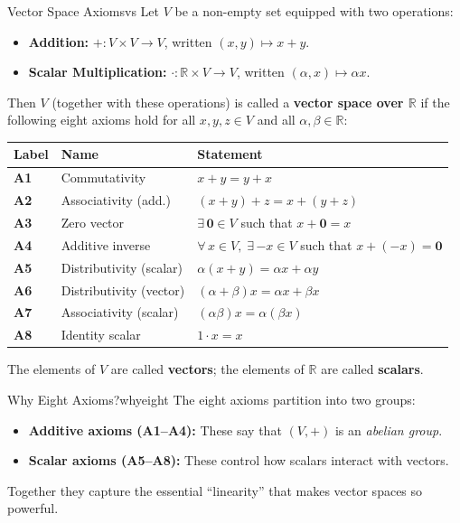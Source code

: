 \documentclass[12pt]{article}
\newcommand{\R}{\mathbb{R}}
\newcommand{\vzero}{\mathbf{0}}
\begin{document}
	\begin{axiombox}{Vector Space Axioms}{vs}
		Let $V$ be a non-empty set equipped with two operations:
		\begin{itemize}[leftmargin=2em]
			\item \textbf{Addition:} $+ : V\times V \to V$, written $(x,y)\mapsto x+y$.
			\item \textbf{Scalar Multiplication:} $\cdot : \R\times V \to V$,
			written $(\alpha, x)\mapsto \alpha x$.
		\end{itemize}
		Then $V$ (together with these operations) is called a \textbf{vector space over
			$\R$} if the following eight axioms hold for all $x,y,z\in V$ and all
		$\alpha,\beta\in\R$:
		
		\medskip
		\begin{tabular}{>{\bfseries}p{1.2cm} p{4.5cm} p{8cm}}
			\toprule
			Label & Name & Statement \\
			\midrule
			A1 & Commutativity &
			$x + y = y + x$ \\[4pt]
			A2 & Associativity (add.) &
			$(x + y) + z = x + (y + z)$ \\[4pt]
			A3 & Zero vector &
			$\exists\, \vzero \in V$ such that $x + \vzero = x$ \\[4pt]
			A4 & Additive inverse &
			$\forall\, x \in V,\; \exists\, {-x}\in V$ such that $x + (-x) = \vzero$ \\[4pt]
			A5 & Distributivity (scalar) &
			$\alpha(x + y) = \alpha x + \alpha y$ \\[4pt]
			A6 & Distributivity (vector) &
			$(\alpha + \beta)x = \alpha x + \beta x$ \\[4pt]
			A7 & Associativity (scalar) &
			$(\alpha\beta)x = \alpha(\beta x)$ \\[4pt]
			A8 & Identity scalar &
			$1\cdot x = x$ \\
			\bottomrule
		\end{tabular}
		
		\medskip\noindent
		The elements of $V$ are called \textbf{vectors}; the elements of $\R$ are called
		\textbf{scalars}.
	\end{axiombox}
	
	\begin{remark}{Why Eight Axioms?}{whyeight}
		The eight axioms partition into two groups:
		\begin{itemize}[leftmargin=2em]
			\item \textbf{Additive axioms (A1--A4):} These say that $(V,+)$ is an
			\emph{abelian group}.
			\item \textbf{Scalar axioms (A5--A8):} These control how scalars interact
			with vectors.
		\end{itemize}
		Together they capture the essential ``linearity'' that makes vector spaces
		so powerful.
	\end{remark}
	
\end{document}
